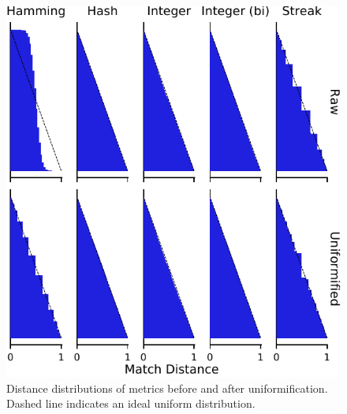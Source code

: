 \begin{figure}
\begin{center}

\includegraphics[width=\columnwidth]{img/uniformification/bitweight=0dot5+seed=1+title=low-score-distribution+_data_hathash_hash=75684cf1e73fb7f1+_script_fullcat_hash=d4b3b5e14a0d1350+ext=}
\caption{
Distance distributions of metrics before and after uniformification.
Dashed line indicates an ideal uniform distribution.
}
\label{fig:uniformification}

\end{center}
\end{figure}
